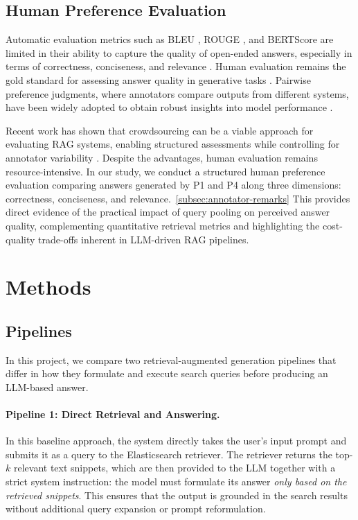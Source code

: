 \documentclass[manuscript,screen]{acmart}
\begin{document}
\begin{CCSXML}
	\subsection{Human Preference Evaluation}
	\label{subsec:human-preference-eval}
	Automatic evaluation metrics such as BLEU \cite{post-2018-call}, ROUGE \cite{lin-2004-rouge}, and BERTScore \cite{zhang2020bertscoreevaluatingtextgeneration} are limited in their ability to capture the quality of open-ended answers, especially in terms of correctness, conciseness, and relevance \cite{karpukhin-etal-2020-dense}. Human evaluation remains the gold standard for assessing answer quality in generative tasks \cite{bai2022traininghelpfulharmlessassistant,thoppilan2022lamdalanguagemodelsdialog}. Pairwise preference judgments, where annotators compare outputs from different systems, have been widely adopted to obtain robust insights into model performance \cite{stiennon2022learningsummarizehumanfeedback}. 
	
	Recent work has shown that crowdsourcing can be a viable approach for evaluating RAG systems, enabling structured assessments while controlling for annotator variability \cite{Gienapp_2025}. Despite the advantages, human evaluation remains resource-intensive. In our study, we conduct a structured human preference evaluation comparing answers generated by P1 and P4 along three dimensions: correctness, conciseness, and relevance.~\ref{subsec:annotator-remarks} This provides direct evidence of the practical impact of query pooling on perceived answer quality, complementing quantitative retrieval metrics and highlighting the cost-quality trade-offs inherent in LLM-driven RAG pipelines.


\section{Methods}

	\subsection{Pipelines}
	\label{subsec:pipelines}
	
	In this project, we compare two retrieval-augmented generation pipelines that
	differ in how they formulate and execute search queries before producing an
	LLM-based answer.
	
	\paragraph{Pipeline 1: Direct Retrieval and Answering.}
	In this baseline approach, the system directly takes the user’s input prompt
	and submits it as a query to the Elasticsearch retriever. The retriever returns the top-$k$ relevant text
	snippets, which are then provided to the LLM together with a
	strict system instruction: the model must formulate its answer \emph{only based
	on the retrieved snippets}. This ensures that the output is grounded in the
	search results without additional query expansion or prompt reformulation.
	

\end{CCSXML}
\end{document}
